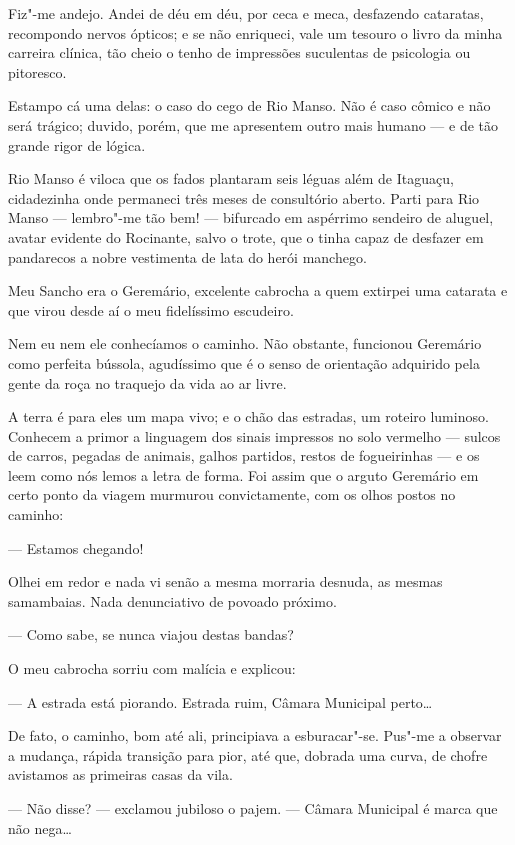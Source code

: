 Fiz"-me andejo. Andei de déu em déu, por ceca e meca, desfazendo
cataratas, recompondo nervos ópticos; e se não enriqueci, vale um
tesouro o livro da minha carreira clínica, tão cheio o tenho de
impressões suculentas de psicologia ou pitoresco.

Estampo cá uma delas: o caso do cego de Rio Manso. Não é caso cômico e
não será trágico; duvido, porém, que me apresentem outro mais humano ---
e de tão grande rigor de lógica.

Rio Manso é viloca que os fados plantaram seis léguas além de Itaguaçu,
cidadezinha onde permaneci três meses de consultório aberto. Parti para
Rio Manso --- lembro"-me tão bem! --- bifurcado em aspérrimo sendeiro de
aluguel, avatar evidente do Rocinante, salvo o trote, que o tinha capaz
de desfazer em pandarecos a nobre vestimenta de lata do herói manchego.

Meu Sancho era o Geremário, excelente cabrocha a quem extirpei uma
catarata e que virou desde aí o meu fidelíssimo escudeiro.

Nem eu nem ele conhecíamos o caminho. Não obstante, funcionou Geremário
como perfeita bússola, agudíssimo que é o senso de orientação adquirido
pela gente da roça no traquejo da vida ao ar livre.

A terra é para eles um mapa vivo; e o chão das estradas, um roteiro
luminoso. Conhecem a primor a linguagem dos sinais impressos no solo
vermelho --- sulcos de carros, pegadas de animais, galhos partidos,
restos de fogueirinhas --- e os leem como nós lemos a letra de forma.
Foi assim que o arguto Geremário em certo ponto da viagem murmurou
convictamente, com os olhos postos no caminho:

--- Estamos chegando!

Olhei em redor e nada vi senão a mesma morraria desnuda, as mesmas
samambaias. Nada denunciativo de povoado próximo.

--- Como sabe, se nunca viajou destas bandas?

O meu cabrocha sorriu com malícia e explicou:

--- A estrada está piorando. Estrada ruim, Câmara Municipal perto\ldots{}

De fato, o caminho, bom até ali, principiava a esburacar"-se. Pus"-me a
observar a mudança, rápida transição para pior, até que, dobrada uma
curva, de chofre avistamos as primeiras casas da vila.

--- Não disse? --- exclamou jubiloso o pajem. --- Câmara Municipal é
marca que não nega\ldots{}

